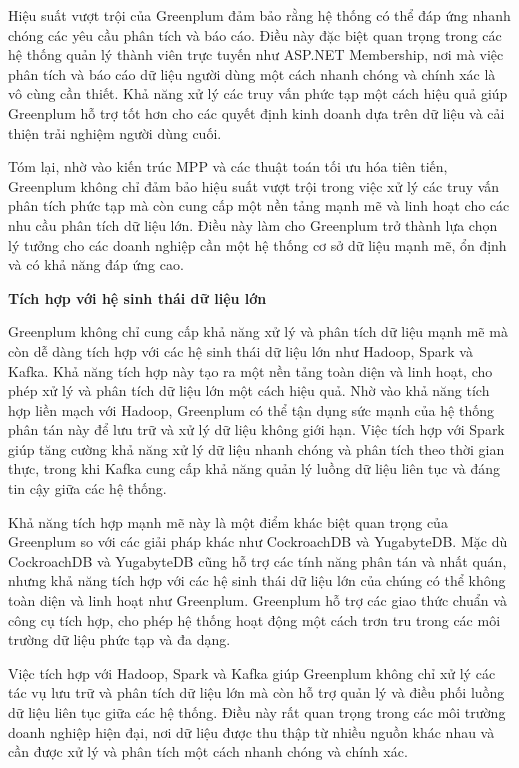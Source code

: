\documentclass{article}[14pt]
\begin{document}
Hiệu suất vượt trội của Greenplum đảm bảo rằng hệ thống có thể đáp ứng nhanh chóng các yêu cầu phân tích và báo cáo. Điều này đặc biệt quan trọng trong các hệ thống quản lý thành viên trực tuyến như ASP.NET Membership, nơi mà việc phân tích và báo cáo dữ liệu người dùng một cách nhanh chóng và chính xác là vô cùng cần thiết. Khả năng xử lý các truy vấn phức tạp một cách hiệu quả giúp Greenplum hỗ trợ tốt hơn cho các quyết định kinh doanh dựa trên dữ liệu và cải thiện trải nghiệm người dùng cuối.

Tóm lại, nhờ vào kiến trúc MPP và các thuật toán tối ưu hóa tiên tiến, Greenplum không chỉ đảm bảo hiệu suất vượt trội trong việc xử lý các truy vấn phân tích phức tạp mà còn cung cấp một nền tảng mạnh mẽ và linh hoạt cho các nhu cầu phân tích dữ liệu lớn. Điều này làm cho Greenplum trở thành lựa chọn lý tưởng cho các doanh nghiệp cần một hệ thống cơ sở dữ liệu mạnh mẽ, ổn định và có khả năng đáp ứng cao.



\textbf{Tích hợp với hệ sinh thái dữ liệu lớn}

Greenplum không chỉ cung cấp khả năng xử lý và phân tích dữ liệu mạnh mẽ mà còn dễ dàng tích hợp với các hệ sinh thái dữ liệu lớn như Hadoop, Spark và Kafka. Khả năng tích hợp này tạo ra một nền tảng toàn diện và linh hoạt, cho phép xử lý và phân tích dữ liệu lớn một cách hiệu quả. Nhờ vào khả năng tích hợp liền mạch với Hadoop, Greenplum có thể tận dụng sức mạnh của hệ thống phân tán này để lưu trữ và xử lý dữ liệu không giới hạn. Việc tích hợp với Spark giúp tăng cường khả năng xử lý dữ liệu nhanh chóng và phân tích theo thời gian thực, trong khi Kafka cung cấp khả năng quản lý luồng dữ liệu liên tục và đáng tin cậy giữa các hệ thống.

Khả năng tích hợp mạnh mẽ này là một điểm khác biệt quan trọng của Greenplum so với các giải pháp khác như CockroachDB và YugabyteDB. Mặc dù CockroachDB và YugabyteDB cũng hỗ trợ các tính năng phân tán và nhất quán, nhưng khả năng tích hợp với các hệ sinh thái dữ liệu lớn của chúng có thể không toàn diện và linh hoạt như Greenplum. Greenplum hỗ trợ các giao thức chuẩn và công cụ tích hợp, cho phép hệ thống hoạt động một cách trơn tru trong các môi trường dữ liệu phức tạp và đa dạng.

Việc tích hợp với Hadoop, Spark và Kafka giúp Greenplum không chỉ xử lý các tác vụ lưu trữ và phân tích dữ liệu lớn mà còn hỗ trợ quản lý và điều phối luồng dữ liệu liên tục giữa các hệ thống. Điều này rất quan trọng trong các môi trường doanh nghiệp hiện đại, nơi dữ liệu được thu thập từ nhiều nguồn khác nhau và cần được xử lý và phân tích một cách nhanh chóng và chính xác.
\end{document}
